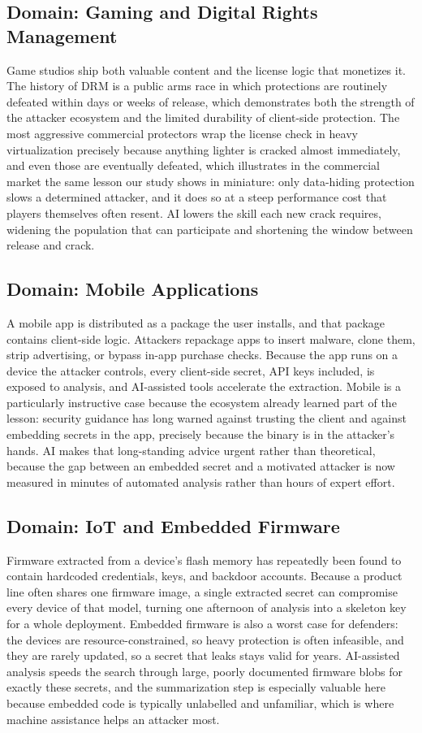 \documentclass[conference]{IEEEtran}
\begin{document}
\subsection{Domain: Gaming and Digital Rights Management}
Game studios ship both valuable content and the license logic that monetizes it.
The history of DRM is a public arms race in which protections are routinely defeated
within days or weeks of release, which demonstrates both the strength of the
attacker ecosystem and the limited durability of client-side protection. The most
aggressive commercial protectors wrap the license check in heavy virtualization
precisely because anything lighter is cracked almost immediately, and even those are
eventually defeated, which illustrates in the commercial market the same lesson our
study shows in miniature: only data-hiding protection slows a determined attacker,
and it does so at a steep performance cost that players themselves often resent. AI
lowers the skill each new crack requires, widening the population that can
participate and shortening the window between release and crack.

\subsection{Domain: Mobile Applications}
A mobile app is distributed as a package the user installs, and that package
contains client-side logic. Attackers repackage apps to insert malware, clone them,
strip advertising, or bypass in-app purchase checks. Because the app runs on a
device the attacker controls, every client-side secret, API keys included, is
exposed to analysis, and AI-assisted tools accelerate the extraction. Mobile is a
particularly instructive case because the ecosystem already learned part of the
lesson: security guidance has long warned against trusting the client and against
embedding secrets in the app, precisely because the binary is in the attacker's
hands. AI makes that long-standing advice urgent rather than theoretical, because
the gap between an embedded secret and a motivated attacker is now measured in
minutes of automated analysis rather than hours of expert effort.

\subsection{Domain: IoT and Embedded Firmware}
Firmware extracted from a device's flash memory has repeatedly been found to contain
hardcoded credentials, keys, and backdoor accounts. Because a product line often
shares one firmware image, a single extracted secret can compromise every device of
that model, turning one afternoon of analysis into a skeleton key for a whole
deployment. Embedded firmware is also a worst case for defenders: the devices are
resource-constrained, so heavy protection is often infeasible, and they are rarely
updated, so a secret that leaks stays valid for years. AI-assisted analysis speeds
the search through large, poorly documented firmware blobs for exactly these
secrets, and the summarization step is especially valuable here because embedded
code is typically unlabelled and unfamiliar, which is where machine assistance helps
an attacker most.
\end{document}
